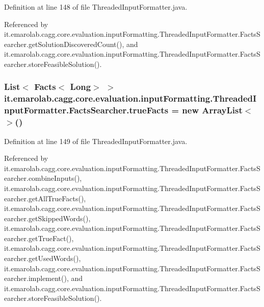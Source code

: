 Definition at line 148 of file Threaded\-Input\-Formatter.\-java.



Referenced by it.\-emarolab.\-cagg.\-core.\-evaluation.\-input\-Formatting.\-Threaded\-Input\-Formatter.\-Facts\-Searcher.\-get\-Solution\-Discovered\-Count(), and it.\-emarolab.\-cagg.\-core.\-evaluation.\-input\-Formatting.\-Threaded\-Input\-Formatter.\-Facts\-Searcher.\-store\-Feasible\-Solution().

\hypertarget{classit_1_1emarolab_1_1cagg_1_1core_1_1evaluation_1_1inputFormatting_1_1ThreadedInputFormatter_1_1FactsSearcher_aac1c50fafd0d1ecbaf80674ffbb6104a}{
\subsubsection[{true\-Facts}]{\setlength{\rightskip}{0pt plus 5cm}List$<$ Facts$<$ Long$>$ $>$ it.\-emarolab.\-cagg.\-core.\-evaluation.\-input\-Formatting.\-Threaded\-Input\-Formatter.\-Facts\-Searcher.\-true\-Facts = new Array\-List$<$$>$()\hspace{0.3cm}{\ttfamily [private]}}}\label{classit_1_1emarolab_1_1cagg_1_1core_1_1evaluation_1_1inputFormatting_1_1ThreadedInputFormatter_1_1FactsSearcher_aac1c50fafd0d1ecbaf80674ffbb6104a}


Definition at line 149 of file Threaded\-Input\-Formatter.\-java.



Referenced by it.\-emarolab.\-cagg.\-core.\-evaluation.\-input\-Formatting.\-Threaded\-Input\-Formatter.\-Facts\-Searcher.\-combine\-Inputs(), it.\-emarolab.\-cagg.\-core.\-evaluation.\-input\-Formatting.\-Threaded\-Input\-Formatter.\-Facts\-Searcher.\-get\-All\-True\-Facts(), it.\-emarolab.\-cagg.\-core.\-evaluation.\-input\-Formatting.\-Threaded\-Input\-Formatter.\-Facts\-Searcher.\-get\-Skipped\-Words(), it.\-emarolab.\-cagg.\-core.\-evaluation.\-input\-Formatting.\-Threaded\-Input\-Formatter.\-Facts\-Searcher.\-get\-True\-Fact(), it.\-emarolab.\-cagg.\-core.\-evaluation.\-input\-Formatting.\-Threaded\-Input\-Formatter.\-Facts\-Searcher.\-get\-Used\-Words(), it.\-emarolab.\-cagg.\-core.\-evaluation.\-input\-Formatting.\-Threaded\-Input\-Formatter.\-Facts\-Searcher.\-implement(), and it.\-emarolab.\-cagg.\-core.\-evaluation.\-input\-Formatting.\-Threaded\-Input\-Formatter.\-Facts\-Searcher.\-store\-Feasible\-Solution().

